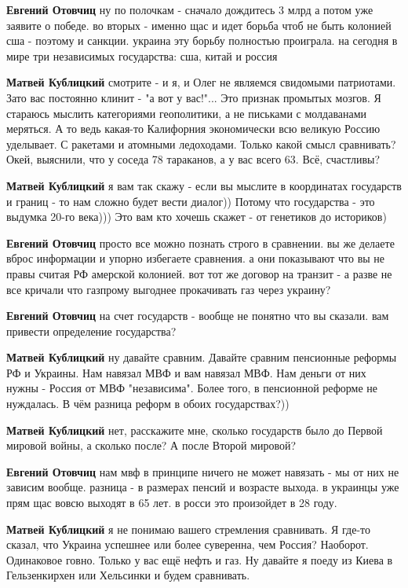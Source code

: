 \begin{itemize}
\begin{itemize}
\textbf{Евгений Отовчиц} ну по полочкам - сначало дождитесь 3 млрд а потом уже заявите о победе. во вторых - именно щас и идет борьба чтоб не быть колонией сша - поэтому и санкции. украина эту борьбу полностью проиграла. на сегодня в мире три независимых государства: сша, китай и россия

\textbf{Матвей Кублицкий} смотрите - и я, и Олег не являемся свидомыми патриотами. Зато вас постоянно клинит - "а вот у вас!"...
Это признак промытых мозгов. Я стараюсь мыслить категориями геополитики, а не письками с молдаванами меряться.
А то ведь какая-то Калифорния экономически всю великую Россию уделывает. С ракетами и атомными ледоходами.
Только какой смысл сравнивать? Окей, выяснили, что у соседа 78 тараканов, а у вас всего 63. Всё, счастливы?

\textbf{Матвей Кублицкий} я вам так скажу - если вы мыслите в координатах государств и границ - то нам сложно будет вести диалог))
Потому что государства - это выдумка 20-го века)))
Это вам кто хочешь скажет - от генетиков до историков)

\textbf{Евгений Отовчиц} просто все можно познать строго в сравнении. вы же делаете вброс информации и упорно избегаете сравнения. а они показывают что вы не правы считая РФ амерской колонией. вот тот же договор на транзит - а разве не все кричали что газпрому выгоднее прокачивать газ через украину?

\textbf{Евгений Отовчиц} на счет государств - вообще не понятно что вы сказали. вам привести определение государства?

\textbf{Матвей Кублицкий} ну давайте сравним. Давайте сравним пенсионные реформы РФ и Украины. Нам навязал МВФ и вам навязал МВФ. Нам деньги от них нужны - Россия от МВФ "независима". Более того, в пенсионной реформе не нуждалась.
В чём разница реформ в обоих государствах?))

\textbf{Матвей Кублицкий} нет, расскажите мне, сколько государств было до Первой мировой войны, а сколько после?
А после Второй мировой?

\textbf{Евгений Отовчиц} нам мвф в принципе ничего не может навязать - мы от них не зависим вообще. разница - в размерах пенсий и возрасте выхода. в украинцы уже прям щас вовсю выходят в 65 лет. в росси это произойдет в 28 году.

\textbf{Матвей Кублицкий} я не понимаю вашего стремления сравнивать. Я где-то сказал, что Украина успешнее или более суверенна, чем Россия?
Наоборот. Одинаковое говно. Только у вас ещё нефть и газ.
Ну давайте я поеду из Киева в Гельзенкирхен или Хельсинки и будем сравнивать.


\end{itemize}
\end{itemize}
